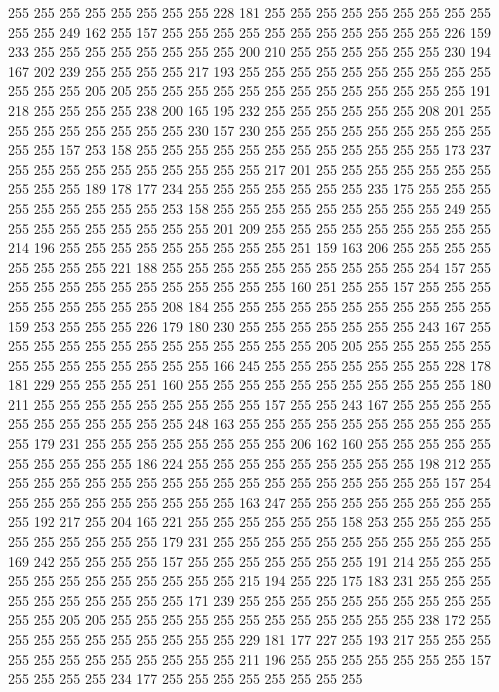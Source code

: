 255 255 255 255 255 255 255 255 228 181 255 255 255 255 255 255 255 255 255 255
255 249 162 255 157 255 255 255 255 255 255 255 255 255 255 255 226 159 233 255
255 255 255 255 255 255 255 200 210 255 255 255 255 255 255 230 194 167 202 239
255 255 255 255 217 193 255 255 255 255 255 255 255 255 255 255 255 255 255 205
205 255 255 255 255 255 255 255 255 255 255 255 255 255 191 218 255 255 255 255
238 200 165 195 232 255 255 255 255 255 255 208 201 255 255 255 255 255 255 255
255 230 157 230 255 255 255 255 255 255 255 255 255 255 255 157 253 158 255 255
255 255 255 255 255 255 255 255 255 255 173 237 255 255 255 255 255 255 255 255
255 255 217 201 255 255 255 255 255 255 255 255 255 255 189 178 177 234 255 255
255 255 255 255 255 235 175 255 255 255 255 255 255 255 255 255 253 158 255 255
255 255 255 255 255 255 255 249 255 255 255 255 255 255 255 255 255 201 209 255
255 255 255 255 255 255 255 255 214 196 255 255 255 255 255 255 255 255 255 251
159 163 206 255 255 255 255 255 255 255 255 221 188 255 255 255 255 255 255 255
255 255 255 254 157 255 255 255 255 255 255 255 255 255 255 255 255 160 251 255
255 157 255 255 255 255 255 255 255 255 255 208 184 255 255 255 255 255 255 255
255 255 255 255 159 253 255 255 255 226 179 180 230 255 255 255 255 255 255 255
243 167 255 255 255 255 255 255 255 255 255 255 255 255 255 205 205 255 255 255
255 255 255 255 255 255 255 255 255 255 166 245 255 255 255 255 255 255 255 228
178 181 229 255 255 255 251 160 255 255 255 255 255 255 255 255 255 255 255 180
211 255 255 255 255 255 255 255 255 255 157 255 255 243 167 255 255 255 255 255
255 255 255 255 255 255 248 163 255 255 255 255 255 255 255 255 255 255 255 179
231 255 255 255 255 255 255 255 255 206 162 160 255 255 255 255 255 255 255 255
255 255 186 224 255 255 255 255 255 255 255 255 255 198 212 255 255 255 255 255
255 255 255 255 255 255 255 255 255 255 255 255 255 157 254 255 255 255 255 255
255 255 255 255 163 247 255 255 255 255 255 255 255 255 255 192 217 255 204 165
221 255 255 255 255 255 255 158 253 255 255 255 255 255 255 255 255 255 255 179
231 255 255 255 255 255 255 255 255 255 255 255 169 242 255 255 255 255 157 255
255 255 255 255 255 255 191 214 255 255 255 255 255 255 255 255 255 255 255 255
215 194 255 225 175 183 231 255 255 255 255 255 255 255 255 255 255 171 239 255
255 255 255 255 255 255 255 255 255 255 255 205 205 255 255 255 255 255 255 255
255 255 255 255 255 238 172 255 255 255 255 255 255 255 255 255 255 229 181 177
227 255 193 217 255 255 255 255 255 255 255 255 255 255 255 255 211 196 255 255
255 255 255 255 255 157 255 255 255 255 234 177 255 255 255 255 255 255 255 255
